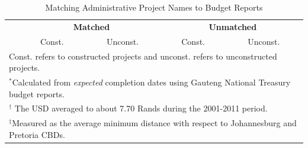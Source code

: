 \documentclass[12pt]{article}
\begin{document}
\vspace{0mm}
\begin{table}[h!]
\centering
\caption{Matching Administrative Project Names to Budget Reports}\label{table:scoredescriptives}
\vspace{0mm}
\begin{tabular}{l*{1}{cccc}}
\toprule
  & \multicolumn{2}{c}{\textbf{Matched}}& \multicolumn{2}{c}{\textbf{Unmatched}}    \\
  & Const. & Unconst. & Const. & Unconst.   \\
\midrule

\bottomrule
\multicolumn{5}{l}{\scriptsize Const. refers to constructed projects and unconst. refers to unconstructed projects.}\\[-.5em]
\multicolumn{5}{l}{\scriptsize $^*$Calculated from {\it expected} completion dates using Gauteng National Treasury budget reports.}\\[-.5em]
\multicolumn{5}{l}{\scriptsize $^\dagger$ The USD averaged to about 7.70 Rands during the 2001-2011 period.}\\[-.5em]
\multicolumn{5}{l}{\scriptsize $^\ddagger$Measured as the average minimum distance with respect to Johannesburg and Pretoria CBDs. } \\[-.5em]
\end{tabular}
\end{table} 
\end{document}
